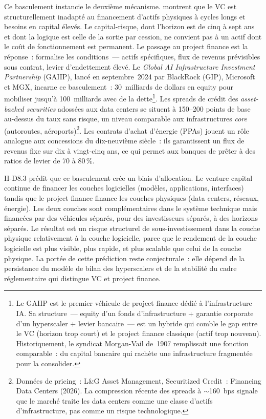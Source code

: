 Ce basculement instancie le deuxième mécanisme. \textcite{lerner_venture_2020} montrent que le VC est structurellement inadapté au financement d'actifs physiques à cycles longs et besoins en capital élevés. Le capital-risque, dont l'horizon est de cinq à sept ans et dont la logique est celle de la sortie par cession, ne convient pas à un actif dont le coût de fonctionnement est permanent. Le passage au project finance est la réponse~: \textcite{esty_why_2004} formalise les conditions~--- actifs spécifiques, flux de revenus prévisibles sous contrat, levier d'endettement élevé. Le \emph{Global AI Infrastructure Investment Partnership} (GAIIP), lancé en septembre~2024 par BlackRock (GIP), Microsoft et MGX, incarne ce basculement~: 30~milliards de dollars en equity pour mobiliser jusqu'à 100~milliards avec de la dette\footnote{Le GAIIP est le premier véhicule de project finance dédié à l'infrastructure IA. Sa structure~--- equity d'un fonds d'infrastructure + garantie corporate d'un hyperscaler + levier bancaire~--- est un hybride qui comble le gap entre le VC (horizon trop court) et le project finance classique (actif trop nouveau). Historiquement, le syndicat Morgan-Vail de~1907 remplissait une fonction comparable~: du capital bancaire qui rachète une infrastructure fragmentée pour la consolider.}. Les spreads de crédit des \emph{asset-backed securities} adossées aux data centers se situent à 150--200 points de base au-dessus du taux sans risque, un niveau comparable aux infrastructures \emph{core} (autoroutes, aéroports)\footnote{Données de pricing~: L\&G Asset Management, \og Securitized Credit~: Financing Data Centers\fg{} (2026). La compression récente des spreads à ${\sim}$160~bps signale que le marché traite les data centers comme une classe d'actifs d'infrastructure, pas comme un risque technologique.}. Les contrats d'achat d'énergie (PPAs) jouent un rôle analogue aux concessions du dix-neuvième siècle~: ils garantissent un flux de revenus fixe sur dix à vingt-cinq ans, ce qui permet aux banques de prêter à des ratios de levier de 70 à 80\,\%.

H-D8.3 prédit que ce basculement crée un biais d'allocation. Le venture capital continue de financer les couches logicielles (modèles, applications, interfaces) tandis que le project finance finance les couches physiques (data centers, réseaux, énergie). Les deux couches sont complémentaires dans le système technique mais financées par des véhicules séparés, pour des investisseurs séparés, à des horizons séparés. Le résultat est un risque structurel de sous-investissement dans la couche physique relativement à la couche logicielle, parce que le rendement de la couche logicielle est plus visible, plus rapide, et plus scalable que celui de la couche physique. La portée de cette prédiction reste conjecturale~: elle dépend de la persistance du modèle de bilan des hyperscalers et de la stabilité du cadre réglementaire qui distingue VC et project finance.

